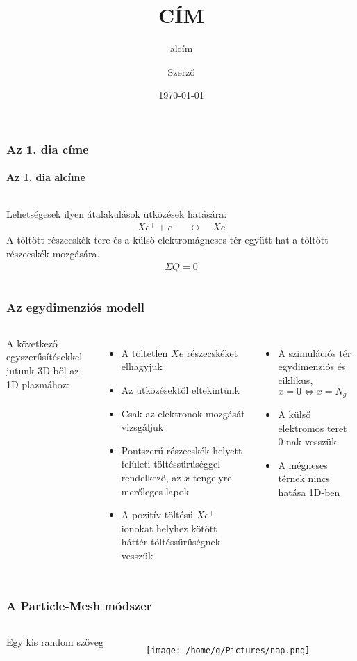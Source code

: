 \documentclass{article}
\title{CÍM}			%
\subtitle{alcím} 	%
\date{\today}
\author{Szerző}	%
\institute{Institute} %
\begin{document}
\maketitle	%

\begin{frame}
	\frametitle{Az 1. dia címe}
	\framesubtitle{Az 1. dia alcíme}
	\begin{columns}	
			\blindtext
			Lehetségesek ilyen átalakulások ütközések hatására:
			\begin{align*}
				Xe^+ + e^- \quad \longleftrightarrow \quad Xe
			\end{align*}		
			A töltött részecskék tere és a külső elektromágneses tér együtt hat a töltött részecskék mozgására.
			\begin{align*}
				\Sigma Q = 0
			\end{align*}
	\end{columns}
\end{frame}

\begin{frame}
	\frametitle{Az egydimenziós modell}
	\begin{columns}
		\column{0.48\textwidth}
			A következő egyszerűsítésekkel jutunk 3D-ből az 1D plazmához: \\
			\begin{itemize}
				\item A töltetlen $Xe$ részecskéket elhagyjuk
				\item Az ütközésektől eltekintünk
				\item Csak az elektronok mozgását vizsgáljuk
				\item Pontszerű részecskék helyett felületi töltéssűrűséggel rendelkező, az $x$ tengelyre merőleges lapok
				\item A pozitív töltésű $Xe^+$ ionokat helyhez kötött háttér-töltéssűrűségnek vesszük
			\end{itemize}
		\column{0.48\textwidth}
			\begin{itemize}
				\item A szimulációs tér egydimenziós és ciklikus, $x=0 \Longleftrightarrow x=N_g$
				\item A külső elektromos teret 0-nak vesszük
				\item A mégneses térnek nincs hatása 1D-ben
			\end{itemize}
	\end{columns}
\end{frame}

\begin{frame}
	\frametitle{A Particle-Mesh módszer}
	\begin{columns}
			Egy kis random szöveg
			\begin{figure}
				\texttt{[image: /home/g/Pictures/nap.png]}
			\end{figure}
	\end{columns}
\end{frame}
\end{document}
